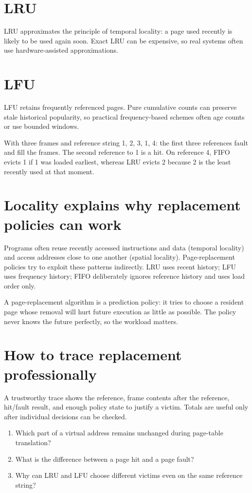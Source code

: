 \section{LRU}
LRU approximates the principle of temporal locality: a page used recently is likely to be used again soon. Exact LRU can be expensive, so real systems often use hardware-assisted approximations.

\section{LFU}
LFU retains frequently referenced pages. Pure cumulative counts can preserve stale historical popularity, so practical frequency-based schemes often age counts or use bounded windows.

\begin{workedexample}
With three frames and reference string 1, 2, 3, 1, 4: the first three references fault and fill the frames. The second reference to 1 is a hit. On reference 4, FIFO evicts 1 if 1 was loaded earliest, whereas LRU evicts 2 because 2 is the least recently used at that moment.
\end{workedexample}

\section{Locality explains why replacement policies can work}
Programs often reuse recently accessed instructions and data (temporal locality) and access addresses close to one another (spatial locality). Page-replacement policies try to exploit these patterns indirectly. LRU uses recent history; LFU uses frequency history; FIFO deliberately ignores reference history and uses load order only.

\begin{keyidea}
A page-replacement algorithm is a prediction policy: it tries to choose a resident page whose removal will hurt future execution as little as possible. The policy never knows the future perfectly, so the workload matters.
\end{keyidea}

\section{How to trace replacement professionally}
A trustworthy trace shows the reference, frame contents after the reference, hit/fault result, and enough policy state to justify a victim. Totals are useful only after individual decisions can be checked.

\begin{quickcheck}
\begin{enumerate}
  \item Which part of a virtual address remains unchanged during page-table translation?
  \item What is the difference between a page hit and a page fault?
  \item Why can LRU and LFU choose different victims even on the same reference string?
\end{enumerate}
\end{quickcheck}
